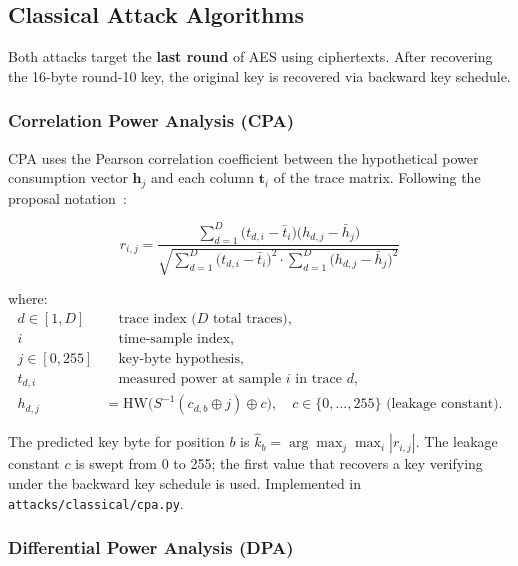 \subsection{Classical Attack Algorithms}
\label{sec:method:attack}

Both attacks target the \textbf{last round} of AES using ciphertexts.
After recovering the 16-byte round-10 key, the original key is recovered
via backward key schedule.

\subsubsection{Correlation Power Analysis (CPA)}

CPA uses the Pearson correlation coefficient between the hypothetical power
consumption vector $\mathbf{h}_j$ and each column $\mathbf{t}_i$ of the
trace matrix.
Following the proposal notation~\cite{brier2004cpa}:

\begin{equation}
  r_{i,j} = \frac{\displaystyle\sum_{d=1}^{D}
    \bigl(t_{d,i} - \bar{t}_i\bigr)\bigl(h_{d,j} - \bar{h}_j\bigr)}
  {\sqrt{\displaystyle\sum_{d=1}^{D}\bigl(t_{d,i}-\bar{t}_i\bigr)^2
         \cdot \sum_{d=1}^{D}\bigl(h_{d,j}-\bar{h}_j\bigr)^2}}
  \label{eq:cpa}
\end{equation}

where:
\begin{align*}
  d \in [1,D]   &\quad \text{trace index (}D\text{ total traces)}, \\
  i             &\quad \text{time-sample index}, \\
  j \in [0,255] &\quad \text{key-byte hypothesis}, \\
  t_{d,i}       &\quad \text{measured power at sample }i\text{ in trace }d, \\
  h_{d,j}       &= \mathrm{HW}\!\bigl(S^{-1}(c_{d,b} \oplus j) \oplus c\bigr),
                    \quad c \in \{0,\ldots,255\}\text{ (leakage constant)}.
\end{align*}

The predicted key byte for position $b$ is
$\hat{k}_b = \arg\max_j \max_i |r_{i,j}|$.
The leakage constant $c$ is swept from 0 to 255; the first value that
recovers a key verifying under the backward key schedule is used.
Implemented in \texttt{attacks/classical/cpa.py}.

\subsubsection{Differential Power Analysis (DPA)}

